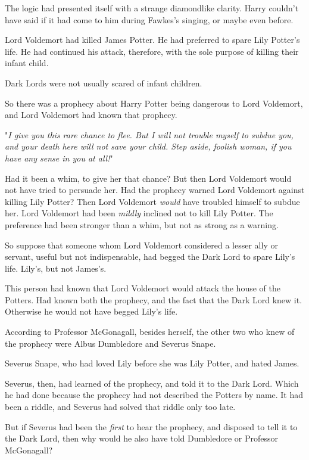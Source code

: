 The logic had presented itself with a strange diamondlike clarity. Harry 
couldn't have said if it had come to him during Fawkes's singing, or maybe even 
before.

Lord Voldemort had killed James Potter. He had preferred to spare Lily Potter's 
life. He had continued his attack, therefore, with the sole purpose of killing 
their infant child.

Dark Lords were not usually scared of infant children.

So there was a prophecy about Harry Potter being dangerous to Lord Voldemort, 
and Lord Voldemort had known that prophecy.

"\emph{I give you this rare chance to flee. But I will not trouble myself to 
subdue you, and your death here will not save your child. Step aside, foolish 
woman, if you have any sense in you at all!}"

Had it been a whim, to give her that chance? But then Lord Voldemort would not 
have tried to persuade her. Had the prophecy warned Lord Voldemort against 
killing Lily Potter? Then Lord Voldemort \emph{would} have troubled himself to 
subdue her. Lord Voldemort had been \emph{mildly} inclined not to kill Lily 
Potter. The preference had been stronger than a whim, but not as strong as a 
warning.

So suppose that someone whom Lord Voldemort considered a lesser ally or 
servant, useful but not indispensable, had begged the Dark Lord to spare Lily's 
life. Lily's, but not James's.

This person had known that Lord Voldemort would attack the house of the 
Potters. Had known both the prophecy, and the fact that the Dark Lord knew it. 
Otherwise he would not have begged Lily's life.

According to Professor McGonagall, besides herself, the other two who knew of 
the prophecy were Albus Dumbledore and Severus Snape.

Severus Snape, who had loved Lily before she was Lily Potter, and hated James.

Severus, then, had learned of the prophecy, and told it to the Dark Lord. Which 
he had done because the prophecy had not described the Potters by name. It had 
been a riddle, and Severus had solved that riddle only too late.

But if Severus had been the \emph{first} to hear the prophecy, and disposed to 
tell it to the Dark Lord, then why would he also have told Dumbledore or 
Professor McGonagall?

